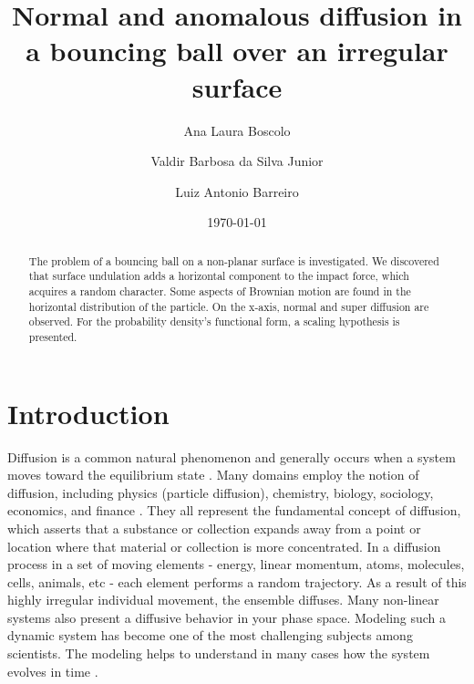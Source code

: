 \documentclass[reprint, aps, pre,nofootinbib]{revtex4-1}
\begin{document}
\title{Normal and anomalous diffusion in a bouncing ball over an irregular
surface}
\author{Ana Laura Boscolo}
\author{Valdir Barbosa da Silva Junior}
\author{Luiz Antonio Barreiro}

\address{S\~ao Paulo State University (Unesp), Institute of Geosciences and Exact
Sciences, ~\linebreak{}
Physics Department, CEP 13506-900, Rio Claro, S\~ao Paulo, Brazil}
\date{\today}
\begin{abstract}
The problem of a bouncing ball on a non-planar surface is investigated.
We discovered that surface undulation adds a horizontal component
to the impact force, which acquires a random character. Some aspects
of Brownian motion are found in the horizontal distribution of the
particle. On the x-axis, normal and super diffusion are observed.
For the probability density's functional form, a scaling hypothesis
is presented. 
\end{abstract}
\maketitle

\section{Introduction}

Diffusion is a common natural phenomenon and generally occurs when
a system moves toward the equilibrium state \citep{Ma1985}. Many
domains employ the notion of diffusion, including physics (particle
diffusion), chemistry, biology, sociology, economics, and finance
\citep{Berryman1977,Shlesinger1986,Yu2003}. They all represent the
fundamental concept of diffusion, which asserts that a substance or
collection expands away from a point or location where that material
or collection is more concentrated. In a diffusion process in a set
of moving elements - energy, linear momentum, atoms, molecules, cells,
animals, etc - each element performs a random trajectory. As a result
of this highly irregular individual movement, the ensemble diffuses.
Many non-linear systems also present a diffusive behavior in your
phase space. Modeling such a dynamic system has become one of the
most challenging subjects among scientists. The modeling helps to
understand in many cases how the system evolves in time \citep{Lichtenberg1992,Strogatz,Strogatz1994}.
\end{document}
